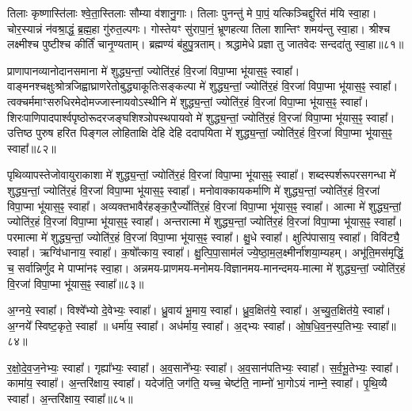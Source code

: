 तिलाः कृष्णास्ति॑लाः श्वे॒ता॒स्तिलाः सौम्या व॑शानु॒गाः। 
तिलाः पुनन्तु॑ मे पा॒पं॒ यत्किञ्चिद्दुरितं म॑यि स्वा॒हा। 
चोर॒स्यान्नं न॑वश्रा॒द्धं॒ ब्र॒ह्म॒हा गु॑रुत॒ल्पगः। 
गोस्तेयꣳ सु॑रापा॒नं॒ भ्रूणहत्या तिला शान्तिꣳ शमय॑न्तु स्वा॒हा। 
श्रीश्च लक्ष्मीश्च पुष्टीश्च कीर्तिं॑ चानृ॒ण्यताम्। 
ब्रह्मण्यं ब॑हुपु॒त्रताम्। 
श्रद्धामेधे प्रज्ञा तु जातवेदः सन्ददा॑तु स्वा॒हा॥८१॥
 \anuvakamend

प्राणापानव्यानोदानसमाना मे॑ शुद्ध्य॒न्तां॒ ज्योति॑र॒हं वि॒रजा॑ विपा॒प्मा भू॑यास॒ꣴ॒ स्वाहा᳚।
वाङ्मनश्चक्षुःश्रोत्रजिह्वाघ्राणरेतो\-बुद्ध्याकूतिः\-सङ्कल्पा मे॑ शुद्ध्य॒न्तां॒ ज्योति॑र॒हं वि॒रजा॑ विपा॒प्मा भू॑यास॒ꣴ॒ स्वाहा᳚। 
त्वक्चर्ममाꣳसरुधिरमेदोमज्जास्नायवो\-ऽस्थीनि  मे॑ शुद्ध्य॒न्तां॒ ज्योति॑र॒हं वि॒रजा॑ विपा॒प्मा भू॑यास॒ꣴ॒ स्वाहा᳚। 
शिरःपाणिपादपार्श्वपृष्ठोरूदरजङ्घशिश्ञोपस्थपायवो  मे॑ शुद्ध्य॒न्तां॒ ज्योति॑र॒हं वि॒रजा॑ विपा॒प्मा भू॑यास॒ꣴ॒ स्वाहा᳚।
उत्तिष्ठ पुरुष हरित पिङ्गल लोहिताक्षि देहि देहि ददापयिता मे॑ शुद्ध्य॒न्तां॒ ज्योति॑र॒हं वि॒रजा॑ विपा॒प्मा भू॑यास॒ꣴ॒ स्वाहा᳚॥८२॥ 
\anuvakamend

पृथिव्यापस्तेजोवायुराकाशा मे॑ शुद्ध्य॒न्तां॒ ज्योति॑र॒हं वि॒रजा॑ विपा॒प्मा भू॑यास॒ꣴ॒ स्वाहा᳚। 
शब्दस्पर्शरूपरसगन्धा  मे॑ शुद्ध्य॒न्तां॒ ज्योति॑र॒हं वि॒रजा॑ विपा॒प्मा भू॑यास॒ꣴ॒ स्वाहा᳚। 
मनोवाक्कायकर्माणि  मे॑ शुद्ध्य॒न्तां॒ ज्योति॑र॒हं वि॒रजा॑ विपा॒प्मा भू॑यास॒ꣴ॒ स्वाहा᳚। 
अव्यक्तभावैर॑हङ्का॒रै॒र्ज्योति॑र॒हं वि॒रजा॑ विपा॒प्मा भू॑यास॒ꣴ॒ स्वाहा᳚। 
आत्मा मे॑ शुद्ध्य॒न्तां॒ ज्योति॑र॒हं वि॒रजा॑ विपा॒प्मा भू॑यास॒ꣴ॒ स्वाहा᳚। 
अन्तरात्मा मे॑ शुद्ध्य॒न्तां॒ ज्योति॑र॒हं वि॒रजा॑ विपा॒प्मा भू॑यास॒ꣴ॒ स्वाहा᳚। 
परमात्मा  मे॑ शुद्ध्य॒न्तां॒ ज्योति॑र॒हं वि॒रजा॑ विपा॒प्मा भू॑यास॒ꣴ॒ स्वाहा᳚। 
क्षु॒धे स्वाहा᳚। 
क्षुत्पि॑पासाय॒ स्वाहा᳚। 
विवि॑ट्यै॒ स्वाहा᳚। 
ऋग्वि॑धानाय॒ स्वाहा᳚। 
क॒षो᳚त्काय॒ स्वाहा᳚। 
क्षु॒त्पि॒पा॒साम॑लं ज्ये॒ष्ठा॒म॒ल॒क्ष्मीर्ना॑शया॒म्यहम्। 
अभू॑ति॒मस॑मृद्धिं॒ च॒ सर्वान्निर्णुद मे पाप्मा॑नꣴ स्वा॒हा।
अन्नमय-प्राणमय-मनोमय-विज्ञानमय-मानन्दमय-मात्मा मे॑ शुद्ध्य॒न्तां॒ ज्योति॑र॒हं वि॒रजा॑ विपा॒प्मा भू॑यास॒ꣴ॒ स्वाहा᳚॥८३॥
\anuvakamend

अ॒ग्नये॒ स्वाहा᳚। 
विश्वे᳚भ्यो दे॒वेभ्यः॒ स्वाहा᳚। 
ध्रु॒वाय॑ भू॒माय॒ स्वाहा᳚। 
ध्रु॒व॒क्षित॑ये॒ स्वाहा᳚। 
अ॒च्यु॒त॒क्षित॑ये॒ स्वाहा᳚। 
अ॒ग्नये᳚ स्विष्ट॒कृते॒ स्वाहा᳚ ॥ 
धर्मा॑य॒ स्वाहा᳚। 
अध॑र्माय॒ स्वाहा᳚। 
अ॒द्भ्यः स्वाहा᳚। 
ओ॒ष॒धि॒व॒न॒स्प॒तिभ्यः॒ स्वाहा᳚॥८४॥ 


र॒क्षो॒दे॒व॒ज॒नेभ्यः॒ स्वाहा᳚। 
गृह्या᳚भ्यः॒ स्वाहा᳚। 
अ॒व॒साने᳚भ्यः॒ स्वाहा᳚। 
अ॒व॒सान॑पतिभ्यः॒ स्वाहा᳚। 
स॒र्व॒भू॒तेभ्यः॒ स्वाहा᳚। 
कामा॑य॒ स्वाहा᳚। 
अ॒न्तरि॑क्षाय॒ स्वाहा᳚। 
यदेज॑ति॒ जग॑ति॒ यच्च॒ चेष्ट॑ति॒ नाम्नो॑ भा॒गोऽयं नाम्ने॒ स्वाहा᳚। 
पृ॒थि॒व्यै स्वाहा᳚। 
अ॒न्तरि॑क्षाय॒ स्वाहा᳚॥८५॥ 



